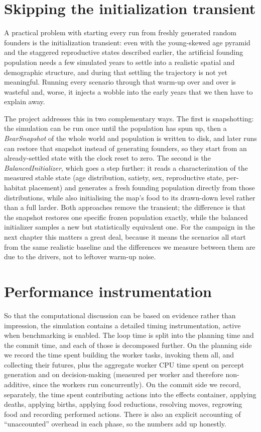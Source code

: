 \section{Skipping the initialization transient}

A practical problem with starting every run from freshly generated random founders is the initialization transient: even with the young-skewed age pyramid and the staggered reproductive states described earlier, the artificial founding population needs a few simulated years to settle into a realistic spatial and demographic structure, and during that settling the trajectory is not yet meaningful. Running every scenario through that warm-up over and over is wasteful and, worse, it injects a wobble into the early years that we then have to explain away.

The project addresses this in two complementary ways. The first is snapshotting: the simulation can be run once until the population has spun up, then a \emph{BearSnapshot} of the whole world and population is written to disk, and later runs can restore that snapshot instead of generating founders, so they start from an already-settled state with the clock reset to zero. The second is the \emph{BalancedInitializer}, which goes a step further: it reads a characterization of the measured stable state (age distribution, satiety, sex, reproductive state, per-habitat placement) and generates a fresh founding population directly from those distributions, while also initialising the map's food to its drawn-down level rather than a full larder. Both approaches remove the transient; the difference is that the snapshot restores one specific frozen population exactly, while the balanced initializer samples a new but statistically equivalent one. For the campaign in the next chapter this matters a great deal, because it means the scenarios all start from the same realistic baseline and the differences we measure between them are due to the drivers, not to leftover warm-up noise.

\section{Performance instrumentation}

So that the computational discussion can be based on evidence rather than impression, the simulation contains a detailed timing instrumentation, active when benchmarking is enabled. The loop time is split into the planning time and the commit time, and each of those is decomposed further. On the planning side we record the time spent building the worker tasks, invoking them all, and collecting their futures, plus the aggregate worker CPU time spent on percept generation and on decision-making (measured per worker and therefore non-additive, since the workers run concurrently). On the commit side we record, separately, the time spent contributing actions into the effects container, applying deaths, applying births, applying food reductions, resolving moves, regrowing food and recording performed actions. There is also an explicit accounting of ``unaccounted'' overhead in each phase, so the numbers add up honestly.

